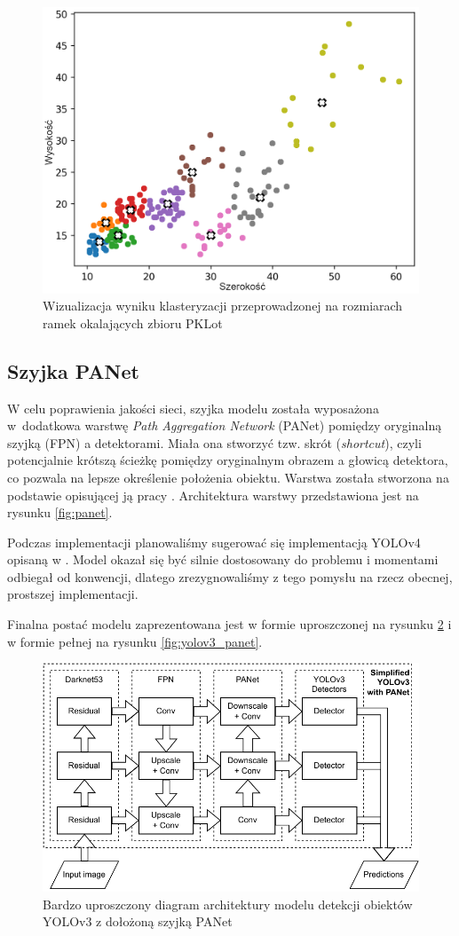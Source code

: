 \documentclass{article}
\begin{document}
\begin{figure}[!h]
    \centering \includegraphics[width=0.65\linewidth]{clustered_anchors}
    \caption{Wizualizacja wyniku klasteryzacji przeprowadzonej na rozmiarach ramek okalających zbioru PKLot}
    \label{fig:clustered_anchors}
\end{figure}

\FloatBarrier

\subsection{Szyjka PANet}

W celu poprawienia jakości sieci, szyjka modelu została wyposażona w~dodatkowa warstwę \textit{Path Aggregation Network} (PANet) pomiędzy oryginalną szyjką (FPN) a detektorami. Miała ona stworzyć tzw. skrót (\textit{shortcut}), czyli potencjalnie krótszą ścieżkę pomiędzy oryginalnym obrazem a głowicą detektora, co pozwala na lepsze określenie położenia obiektu. Warstwa została stworzona na podstawie opisującej ją pracy \citep{liu2018path}. Architektura warstwy przedstawiona jest na rysunku \ref{fig:panet}.

Podczas implementacji planowaliśmy sugerować się implementacją YOLOv4 opisaną w \citep{bochkovskiy2020yolov4}. Model okazał się być silnie dostosowany do problemu i momentami odbiegał od konwencji, dlatego zrezygnowaliśmy z tego pomysłu na rzecz obecnej, prostszej implementacji.

Finalna postać modelu zaprezentowana jest w formie uproszczonej na rysunku \ref{fig:simple_yolov3_panet} i w formie pełnej na rysunku \ref{fig:yolov3_panet}.

\begin{figure}[!h]
    \centering \includegraphics[width=0.65\linewidth]{simple-yolov3-panet}
    \caption{Bardzo uproszczony diagram architektury modelu detekcji obiektów YOLOv3 z dołożoną szyjką PANet}
    \label{fig:simple_yolov3_panet}
\end{figure}
\end{document}
